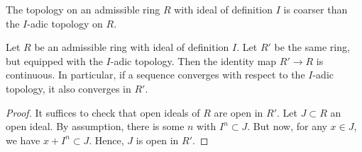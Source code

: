 \documentclass[../main.tex]{subfiles}
\begin{document}
The topology on an admissible ring $R$ with ideal of definition $I$ is coarser
than the $I$-adic topology on $R$.
\begin{lem}\label{lem:AdmAdicComp}
  Let $R$ be an admissible ring with ideal of definition $I$. Let $R'$ be the same 
  ring, but equipped with the $I$-adic topology. Then the identity map $R' \to R$
  is continuous. In particular, if a sequence converges with respect to the
  $I$-adic topology, it also converges in $R'$.
\begin{proof}
  It suffices to check that open ideals of $R$ are open in $R'$. 
  Let $J \subset R$ an open ideal. By assumption, there is some $n$ with $I^n
  \subset J$. But now, for any $x \in J$, we have $x + I^n \subset J$. Hence,
  $J$ is open in $R'$.
\end{proof}
\end{lem}
\end{document}
